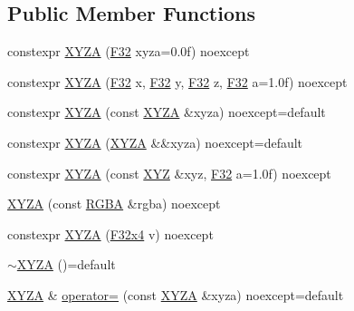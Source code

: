 \subsection*{Public Member Functions}
\begin{DoxyCompactItemize}
\item 
constexpr \mbox{\hyperlink{structmage_1_1_x_y_z_a_ab954075ab032465c9199870646a2718b}{X\+Y\+ZA}} (\mbox{\hyperlink{namespacemage_aa97e833b45f06d60a0a9c4fc22ae02c0}{F32}} xyza=0.\+0f) noexcept
\item 
constexpr \mbox{\hyperlink{structmage_1_1_x_y_z_a_abe082fe71a6b7f7a855b65f5491e24d6}{X\+Y\+ZA}} (\mbox{\hyperlink{namespacemage_aa97e833b45f06d60a0a9c4fc22ae02c0}{F32}} x, \mbox{\hyperlink{namespacemage_aa97e833b45f06d60a0a9c4fc22ae02c0}{F32}} y, \mbox{\hyperlink{namespacemage_aa97e833b45f06d60a0a9c4fc22ae02c0}{F32}} z, \mbox{\hyperlink{namespacemage_aa97e833b45f06d60a0a9c4fc22ae02c0}{F32}} a=1.\+0f) noexcept
\item 
constexpr \mbox{\hyperlink{structmage_1_1_x_y_z_a_a9fdc619e5081ac4ffd6f880ebe49311e}{X\+Y\+ZA}} (const \mbox{\hyperlink{structmage_1_1_x_y_z_a}{X\+Y\+ZA}} \&xyza) noexcept=default
\item 
constexpr \mbox{\hyperlink{structmage_1_1_x_y_z_a_ad5a2327287cd23d1e5bb1bb1b850affd}{X\+Y\+ZA}} (\mbox{\hyperlink{structmage_1_1_x_y_z_a}{X\+Y\+ZA}} \&\&xyza) noexcept=default
\item 
constexpr \mbox{\hyperlink{structmage_1_1_x_y_z_a_a0694b46dd33304f23ca21c0cde51783d}{X\+Y\+ZA}} (const \mbox{\hyperlink{structmage_1_1_x_y_z}{X\+YZ}} \&xyz, \mbox{\hyperlink{namespacemage_aa97e833b45f06d60a0a9c4fc22ae02c0}{F32}} a=1.\+0f) noexcept
\item 
\mbox{\hyperlink{structmage_1_1_x_y_z_a_a8571290c4ba9eaf9d33da17f30b8ac0f}{X\+Y\+ZA}} (const \mbox{\hyperlink{structmage_1_1_r_g_b_a}{R\+G\+BA}} \&rgba) noexcept
\item 
constexpr \mbox{\hyperlink{structmage_1_1_x_y_z_a_a6065beb34f7d2a3ac0a0838a96542aa6}{X\+Y\+ZA}} (\mbox{\hyperlink{namespacemage_a851648f37dfb126a2d2f973e102861ad}{F32x4}} v) noexcept
\item 
\mbox{\hyperlink{structmage_1_1_x_y_z_a_a2f706527b01ff7e86099b76180ebd25f}{$\sim$\+X\+Y\+ZA}} ()=default
\item 
\mbox{\hyperlink{structmage_1_1_x_y_z_a}{X\+Y\+ZA}} \& \mbox{\hyperlink{structmage_1_1_x_y_z_a_a203b9033f20f1d47d654e3bba2e2a62f}{operator=}} (const \mbox{\hyperlink{structmage_1_1_x_y_z_a}{X\+Y\+ZA}} \&xyza) noexcept=default
\item 

\end{DoxyCompactItemize}
